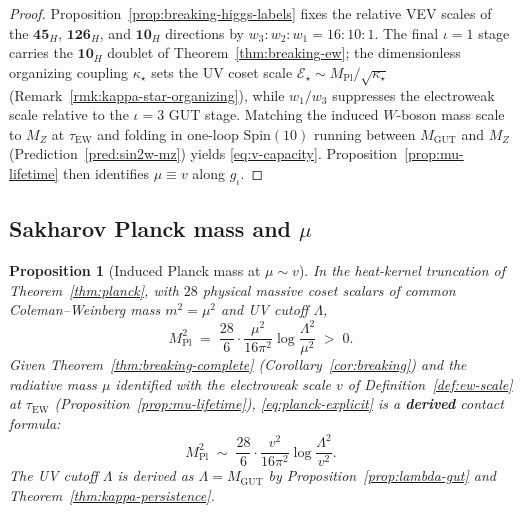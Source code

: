 \documentclass[11pt]{article}
\theoremstyle{plain}
\newtheorem{proposition}[theorem]{Proposition}
\theoremstyle{definition}
\theoremstyle{remark}
\numberwithin{equation}{section}
\newcommand{\Spin}{\mathrm{Spin}}
\newcommand{\MPl}{M_{\mathrm{Pl}}}
\begin{document}
\begin{proof}
Proposition~\ref{prop:breaking-higgs-labels} fixes the relative VEV scales of
the $\mathbf{45}_H$, $\mathbf{126}_H$, and $\mathbf{10}_H$ directions by
$w_3:w_2:w_1=16:10:1$. The final $\iota=1$ stage carries the
$\mathbf{10}_H$ doublet of Theorem~\ref{thm:breaking-ew}; the dimensionless
organizing coupling $\kappa_\star$ sets the UV coset scale
$\mathcal{E}_\star\sim\MPl/\sqrt{\kappa_\star}$ (Remark~\ref{rmk:kappa-star-organizing}),
while $w_1/w_3$ suppresses the electroweak scale relative to the
$\iota=3$ GUT stage. Matching the induced $W$-boson mass scale to $M_Z$ at
$\tau_{\mathrm{EW}}$ and folding in one-loop $\Spin(10)$ running between
$M_{\mathrm{GUT}}$ and $M_Z$ (Prediction~\ref{pred:sin2w-mz}) yields
\eqref{eq:v-capacity}. Proposition~\ref{prop:mu-lifetime} then identifies
$\mu\equiv v$ along $g_\iota$.
\end{proof}

\subsection{Sakharov Planck mass and $\mu$}
\label{sec:scales:planck}

\begin{proposition}[Induced Planck mass at $\mu\sim v$]
\label{prop:planck-scale}
In the heat-kernel truncation of Theorem~\ref{thm:planck}, with $28$ physical
massive coset scalars of common Coleman--Weinberg mass $m^2=\mu^2$ and UV
cutoff $\Lambda$,
\begin{equation}\label{eq:planck-explicit}
  \MPl^2
  \;=\;
  \frac{28}{6}\cdot\frac{\mu^2}{16\pi^2}
  \log\frac{\Lambda^2}{\mu^2}
  \;>\;0.
\end{equation}
Given Theorem~\ref{thm:breaking-complete} (Corollary~\ref{cor:breaking}) and
the radiative mass $\mu$ identified with the electroweak scale $v$ of
Definition~\ref{def:ew-scale} at $\tau_{\mathrm{EW}}$
(Proposition~\ref{prop:mu-lifetime}), \eqref{eq:planck-explicit} is a
\textbf{derived} contact formula:
\begin{equation}\label{eq:planck-v}
  \MPl^2
  \;\sim\;
  \frac{28}{6}\cdot\frac{v^2}{16\pi^2}
  \log\frac{\Lambda^2}{v^2}.
\end{equation}
The UV cutoff $\Lambda$ is derived as $\Lambda=M_{\mathrm{GUT}}$ by
Proposition~\ref{prop:lambda-gut} and Theorem~\ref{thm:kappa-persistence}.
\end{proposition}
\end{document}
